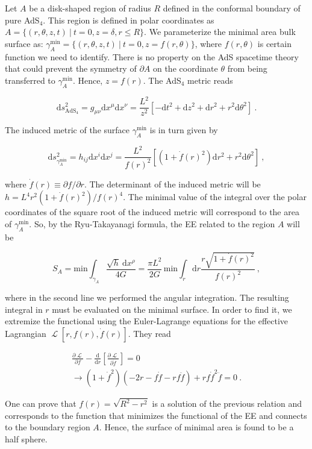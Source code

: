 \documentclass[twocolumn]{revtex4}
\providecommand{\eq}[2]{
    \begin{equation}
        #2
    \label{eq:#1}
    \end{equation}
}
\providecommand{\eqgat}[2]{
    \begin{gather}
        #2
    \label{eq:#1}
    \end{gather}
}
\DeclareMathOperator{\calL}{\mathcal{L}}
\begin{document}
Let $A$ be a disk-shaped region of radius $R$ defined in the conformal boundary of pure AdS$_4$. This region is defined in polar coordinates as
$
    A = \{ ( r, \theta, z, t ) \ | \ t = 0, z = \delta, r \le R \} 
$. 
We parameterize the minimal area bulk surface as:
$
    \gamma_A^\text{min} = \{ ( r, \theta, z, t ) \ | \ t = 0, z = f (r, \theta) \} %
$, 
where $f(r,\theta)$ is certain function we need to identify. There is no property on the AdS spacetime theory that could prevent the symmetry of $\partial A$ on the coordinate $\theta$ from being transferred to $\gamma_A^\text{min}$. Hence, $z=f(r)$.
The AdS$_4$ metric reads
\eq{1Ametric}{
    \mathrm{d}s^2_{\text{AdS}_4} = g_{\mu \nu} \mathrm{d}x^\mu \mathrm{d}x^\nu = 
    \frac{L^2}{z^2} [ -\mathrm{d}t^2 + \mathrm{d}z^2 + \mathrm{d}r^2 + r^2 \mathrm{d}\theta^2 ] \ . \nonumber
}
The induced metric of the surface $\gamma_A^\text{min}$ is in turn given by
\eq{1gammaAmetric}{
    \mathrm{d}s^2_{\gamma_A^\text{min}} = h_{i j} \mathrm{d}x^i \mathrm{d}x^j = 
    \frac{L^2}{f(r)^2} \left[ \left( 1+ \dot{f}(r)^2 \right) \mathrm{d}r^2 + r^2 \mathrm{d}\theta^2 \right] \ , \nonumber
}
where $ \dot{f}(r) \equiv \partial f/\partial r$. The determinant of the induced metric will be
$
    h = L^4 r^2 ( 1 + \dot{f}(r)^2 )/f(r)^4 
$.  
The minimal value of the integral over the polar coordinates of the square root of the induced metric will correspond to the area of $\gamma_A^\text{min}$. So, by the Ryu-Takayanagi formula, the EE related to the region $A$ will be
\eq{1EEA}{
    S_A = \text{min} \int_{\gamma_A}    \frac{\sqrt{h} \ \mathrm{d}x^\rho}{4G} = \frac{\pi L^2}{2G} \, \text{min} \int_r \mathrm{d}r \frac{r \sqrt{ 1 + \dot{f}(r)^2 }}{f(r)^2}  \ ,\nonumber
}
where in the second line we performed the angular integration. The resulting integral in $r$ must be evaluated on the minimal surface. In order to find it, we extremize the functional using the 
Euler-Lagrange equations for the effective Lagrangian $\calL [r,f(r),\dot{f}(r)]$. They read
\eqgat{1EL}{
    \frac{\partial \calL}{\partial f} - \frac{\mathrm{d}}{\mathrm{d}r} \left[ \frac{\partial \calL}{\partial \dot{f}} \right] = 0 \nonumber \\
    \longrightarrow \left( 1+\dot{f}^2 \right) \left( -2r-f\dot{f}-rf\ddot{f} \right) + rf\dot{f}^2\ddot{f} = 0 \ .\nonumber
}
One can prove that $f(r) = \sqrt{R^2 - r^2}$ is a solution of the previous relation and corresponds to the function that minimizes the functional of the EE and connects to the boundary region $A$. Hence, the surface of minimal area is found to be a half sphere.
\end{document}

